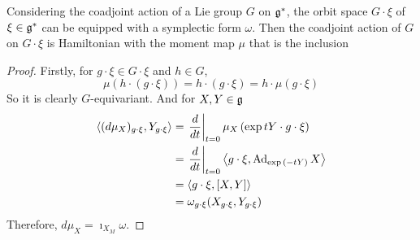 \documentclass[a4paper,12pt]{article}
\begin{document}
	\begin{exam}
		Considering the coadjoint action of a Lie group $G$ on $\mathfrak{g}^*$, the orbit space $G\cdot{\xi}$ of $\xi \in \mathfrak{g}^*$ can be equipped with a symplectic form $\omega$. Then the coadjoint action of $G$ on $G\cdot{\xi}$ is Hamiltonian with the moment map $\mu$ that is the inclusion
		\begin{center}
		\end{center}
		\begin{proof}
			Firstly, for $g \cdot \xi \in G \cdot \xi$ and $h \in G$,
			\begin{equation*}
				\mu(h\cdot(g \cdot \xi)) = h \cdot (g \cdot \xi) =  h \cdot \mu(g \cdot \xi)
			\end{equation*}
			So it is clearly $G$-equivariant. And for $X,Y \in \mathfrak{g}$
			\begin{equation*}
				\begin{split}
					\left\langle (d\mu_X)_{g \cdot \xi},Y_{g \cdot \xi} \right\rangle &= \left.\frac{d}{dt}\right\lvert_{t=0}\mu_X\left(\exp{tY}\cdot g \cdot \xi\right) \\
					&= \left.\frac{d}{dt}\right\lvert_{t=0} \left\langle g \cdot \xi, \operatorname{Ad}_{\exp{(-tY)}}X \right\rangle \\
					&= \left\langle g \cdot \xi,[X,Y] \right\rangle \\
					&= \omega_{g\cdot \xi}(X_{g \cdot \xi},Y_{g \cdot \xi})
				\end{split}
			\end{equation*}
		Therefore, $d\mu_X = \imath_{X_M}\omega$.
		\end{proof}		
	\end{exam}
\end{document}
